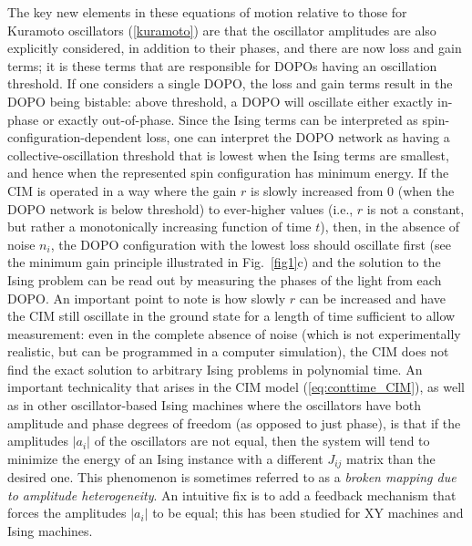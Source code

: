 \documentclass[fleqn,10pt]{wlscirep}
\def\change#1{#1}
\begin{document}
The key new elements in these equations of motion relative to those for Kuramoto oscillators (\ref{kuramoto}) are that the oscillator amplitudes are also explicitly considered, in addition to their phases, and there are now loss and gain terms; it is these terms that are responsible for DOPOs having an oscillation threshold. If one considers a single DOPO, the loss and gain terms result in the DOPO being bistable: above threshold, a DOPO will oscillate either exactly in-phase or exactly out-of-phase. Since the Ising terms can be interpreted as spin-configuration-dependent loss, one can interpret the DOPO network as having a collective-oscillation threshold that is lowest when the Ising terms are smallest, and hence when the represented spin configuration has minimum energy. If the CIM is operated in a way where the gain $r$ is slowly increased from $0$ (when the DOPO network is below threshold) to ever-higher values (i.e., $r$ is not a constant, but rather a monotonically increasing function of time $t$), then, in the absence of noise $n_i$, the DOPO configuration with the lowest loss should oscillate first (see the minimum gain principle illustrated in Fig.~\ref{fig1}c) and the solution to the Ising problem can be read out by measuring the phases of the light from each DOPO. An important point to note is how slowly $r$ can be increased and have the CIM still oscillate in the ground state for a length of time sufficient to allow measurement: even in the complete absence of noise (which is not experimentally realistic, but can be programmed in a computer simulation), the CIM does not find the exact solution to arbitrary Ising problems in polynomial time. \change{An important technicality that arises in the CIM model (\ref{eq:conttime_CIM}), as well as in other oscillator-based Ising machines where the oscillators have both amplitude and phase degrees of freedom (as opposed to just phase), is that if the amplitudes $\left| a_i \right|$ of the oscillators are not equal, then the system will tend to minimize the energy of an Ising instance with a different $J_{ij}$ matrix than the desired one. This phenomenon is sometimes referred to as a \textit{broken mapping due to amplitude heterogeneity}. An intuitive fix is to add a feedback mechanism that forces the amplitudes $\left| a_i \right|$ to be equal; this has been studied for XY machines\cite{kalinin2018networks} and Ising machines\cite{leleu2019destabilization}.}
\end{document}
